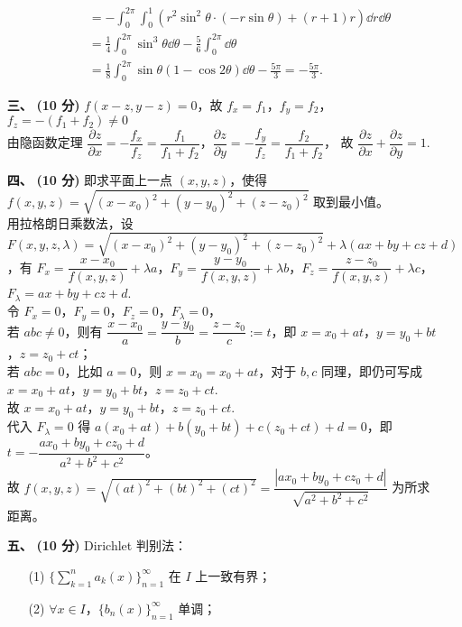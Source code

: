 \documentclass{ctexart}
\begin{document}
\begin{enumerate}
\begin{enumerate}
\begin{align*}
        &=-\int_0^{2\pi}\int_0^1(r^2\sin^2\theta\cdot (-r\sin\theta)+(r+1)r)\dd{r}\dd{\theta} \\
        &=\frac{1}{4}\int_0^{2\pi}\sin^3\theta\dd{\theta}-\frac{5}{6}\int_0^{2\pi}\dd{\theta} \\
        &=\frac{1}{8}\int_0^{2\pi}\sin\theta(1-\cos 2\theta)\dd{\theta}-\frac{5\pi}{3}=-\frac{5\pi}{3}.
        \end{align*}
    \end{enumerate}
    \item[\textbf{三、}] \textbf{(10 分)} $f(x-z,y-z)=0$，故 $f_x=f_1$，$f_y=f_2$，$f_z=-(f_1+f_2)\neq 0$ \\
    由隐函数定理 $\dfrac{\partial z}{\partial x}=-\dfrac{f_x}{f_z}=\dfrac{f_1}{f_1+f_2}$，$\dfrac{\partial z}{\partial y}=-\dfrac{f_y}{f_z}=\dfrac{f_2}{f_1+f_2}$，
    故 $\dfrac{\partial z}{\partial x}+\dfrac{\partial z}{\partial y}=1$.
    \item[\textbf{四、}] \textbf{(10 分)} 即求平面上一点 $(x,y,z)$，使得 $f(x,y,z)=\sqrt{(x-x_0)^2+(y-y_0)^2+(z-z_0)^2}$ 取到最小值。 \\
    用拉格朗日乘数法，设 $F(x,y,z,\lambda)=\sqrt{(x-x_0)^2+(y-y_0)^2+(z-z_0)^2}+\lambda(ax+by+cz+d)$，有 
    $F_x=\dfrac{x-x_0}{f(x,y,z)}+\lambda a$，$F_y=\dfrac{y-y_0}{f(x,y,z)}+\lambda b$，$F_z=\dfrac{z-z_0}{f(x,y,z)}+\lambda c$，$F_\lambda=ax+by+cz+d$. \\
    令 $F_x=0$，$F_y=0$，$F_z=0$，$F_\lambda=0$，\\
    若 $abc\neq 0$，则有 $\dfrac{x-x_0}{a}=\dfrac{y-y_0}{b}=\dfrac{z-z_0}{c}:=t$，即 $x=x_0+at$，$y=y_0+bt$，$z=z_0+ct$；\\
    若 $abc=0$，比如 $a=0$，则 $x=x_0=x_0+at$，对于 $b,c$ 同理，即仍可写成 $x=x_0+at$，$y=y_0+bt$，$z=z_0+ct$. \\
    故 $x=x_0+at$，$y=y_0+bt$，$z=z_0+ct$.\\
    代入 $F_\lambda=0$ 得 $a(x_0+at)+b(y_0+bt)+c(z_0+ct)+d=0$，即 $t=-\dfrac{ax_0+by_0+cz_0+d}{a^2+b^2+c^2}$。\\
    故 $f(x,y,z)=\sqrt{(at)^2+(bt)^2+(ct)^2}=\dfrac{|ax_0+by_0+cz_0+d|}{\sqrt{a^2+b^2+c^2}}$ 为所求距离。
    \item[\textbf{五、}] \textbf{(10 分)} Dirichlet 判别法：
    \begin{enumerate}
        \item[(1)] $\{\displaystyle\sum_{k=1}^na_k(x)\}_{n=1}^{\infty}$ 在 $I$ 上一致有界；
        \item[(2)] $\forall x\in I$，$\{b_n(x)\}_{n=1}^{\infty}$ 单调；

\end{enumerate}
\end{enumerate}
\end{document}
